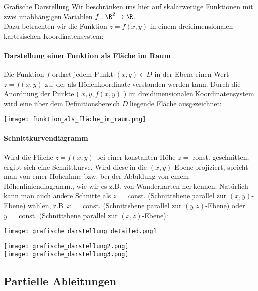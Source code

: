 \begin{concept}{Grafische Darstellung}
    Wir beschränken uns hier auf skalarwertige Funktionen mit zwei unabhängigen Variablen $f: \R^2 \to \R$.\\
    Dazu betrachten wir die Funktion $z = f(x, y)$ in einem dreidimensionalen kartesischen Koordinatensystem:
    
    \paragraph{Darstellung einer Funktion als Fläche im Raum}
    Die Funktion $f$ ordnet jedem Punkt $(x, y) \in D$ in der Ebene einen Wert $z=f(x, y)$ zu, der als Höhenkoordinate verstanden werden kann. 
    Durch die Anordnung der Punkte ( $x, y, f(x, y)$ ) im dreidimensionalen Koordinatensystem wird eine über dem Definitionsbereich $D$ liegende Fläche ausgezeichnet:

    \texttt{[image: funktion\_als\_fläche\_im\_raum.png]}
    
    \paragraph{Schnittkurvendiagramm}
    Wird die Fläche $z=f(x, y)$ bei einer konstanten Höhe $z=$ const. geschnitten, ergibt sich eine Schnittkurve. 
    Wird diese in die $(x, y)$-Ebene projiziert, spricht man von einer Höhenlinie bzw. bei der Abbildung von einem Höhenliniendiagramm., wie wir es z.B. von Wanderkarten her kennen. 
    Natürlich kann man auch andere Schnitte als $z=$ const. (Schnittebene parallel zur $(x, y)$-Ebene) wählen, z.B. $x=$ const. (Schnittebene parallel zur $(y, z)$-Ebene) oder $y=$ const. (Schnittebene parallel zur $(x, z)$-Ebene):

    \begin{minipage}{0.6\linewidth}
    \texttt{[image: grafische\_darstellung\_detailed.png]}
    \end{minipage}
    \begin{minipage}{0.38\linewidth}
    \texttt{[image: grafische\_darstellung2.png]}\\
    \texttt{[image: grafische\_darstellung3.png]}
    \end{minipage}
\end{concept}


\subsection{Partielle Ableitungen}

